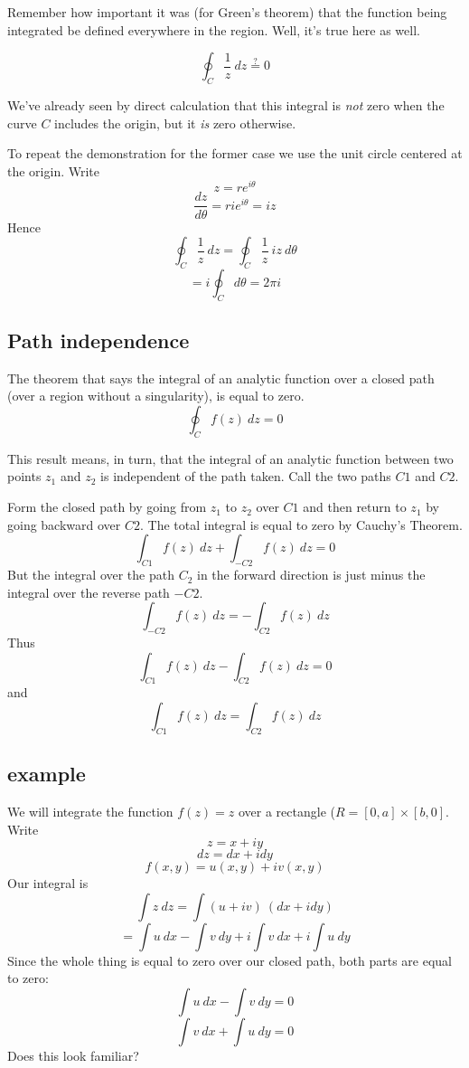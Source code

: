 \documentclass[11pt, oneside]{article}   	%
\begin{document}
Remember how important it was (for Green's theorem) that the function being integrated be defined everywhere in the region.  Well, it's true here as well.

\[ \oint_C \frac{1}{z} \ dz \stackrel{?}{=} 0 \]

We've already seen by direct calculation that this integral is \emph{not} zero when the curve $C$ includes the origin, but it \emph{is} zero otherwise.

To repeat the demonstration for the former case we use the unit circle centered at the origin.  Write
\[ z = r e^{i\theta} \]
\[  \frac{dz}{d\theta} = r i e^{i\theta} = iz \]
Hence
\[ \oint_C \frac{1}{z} \ dz = \oint_C \frac{1}{z} \ iz \ d \theta \]
\[ = i   \oint_C  d \theta = 2 \pi i \]

\subsection*{Path independence}
The theorem that says the integral of an analytic function over a closed path (over a region without a singularity), is equal to zero.
\[ \oint_C f(z) \ dz = 0 \]

This result means, in turn, that the integral of an analytic function between two points $z_1$ and $z_2$ is independent of the path taken.  Call the two paths $C1$ and $C2$.  

Form the closed path by going from $z_1$ to $z_2$ over $C1$ and then return to $z_1$ by going backward over $C2$.  The total integral is equal to zero by Cauchy's Theorem.
\[ \int_{C1} f(z) \ dz + \int_{-C2} f(z) \ dz = 0 \]
But the integral over the path $C_2$ in the forward direction is just minus the integral over the reverse path $-C2$.
\[ \int_{-C2} f(z) \ dz = - \int_{C2} f(z) \ dz \]
Thus
\[ \int_{C1} f(z) \ dz - \int_{C2} f(z) \ dz = 0 \]
and
\[ \int_{C1} f(z) \ dz = \int_{C2} f(z) \ dz \]

\subsection*{example}

We will integrate the function $f(z) = z$ over a rectangle ($R = [0,a] \times [b,0]$.  Write
\[ z = x + i y \]
\[ dz = dx + i dy \]
\[ f(x,y) = u(x,y) + iv(x,y) \]
Our integral is
\[ \int z \ dz = \int (u + iv) \ (dx + i dy) \]
\[ = \int u \ dx - \int v \ dy + i \int v \ dx + i \int u \ dy \]
Since the whole thing is equal to zero over our closed path, both parts are equal to zero:
\[ \int u \ dx - \int v \ dy = 0 \]
\[ \int v \ dx + \int u \ dy = 0 \]
Does this look familiar?
\end{document}
